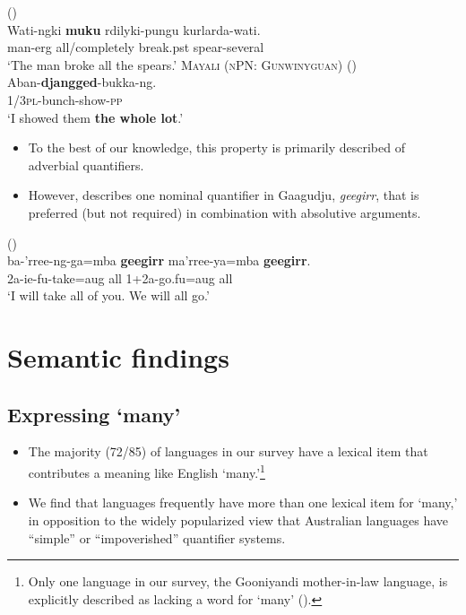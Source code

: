 \documentclass{article}
\makeatletter
\newcommand{\ofy}{/85} %
\makeatother
\begin{document}
\begin{exe}
 (\citealt[15]{bowler17})\\
\gll Wati-ngki \textbf{muku} rdilyki-pungu kurlarda-wati.\\
 man-{\sc erg} all/completely break.{\sc pst} spear-several\\
 \glt `The man broke all the spears.'
\ex \textsc{Mayali (nPN: Gunwinyguan)} (\citealt[233]{evans95})\\
\gll Aban-\textbf{djangged}-bukka-ng.\\
1/3\textsc{pl}-bunch-show-\textsc{pp}\\
\glt `I showed them \textbf{the whole lot}.'
\end{exe}

\begin{itemize}
\item To the best of our knowledge, this property is primarily described of adverbial quantifiers. \item However, \cite{harvey92} describes one nominal quantifier in Gaagudju, {\it geegirr}, that is preferred (but not required) in combination with absolutive arguments.
\end{itemize}

\begin{exe}
 (\citealt[307]{harvey92})\\
\gll ba-'rree-ng-ga=mba \textbf{geegirr} ma'rree-ya=mba \textbf{geegirr}.\\ 
2{\sc a-ie-fu}-take={\sc aug} all 1+2{\sc a}-go.{\sc fu=aug} all\\
\glt `I will take all of you. We will all go.'
\end{exe}


\section{Semantic findings}
\label{sec:semfind}

\subsection{Expressing `many'}

\begin{itemize}
    \item The majority (72\ofy) of languages in our survey have a lexical item that  contributes a meaning like English `many.'\footnote{Only one language in our survey, the Gooniyandi mother-in-law language, is explicitly described as lacking a word for `many' (\citealt[636]{mcgregor89}).}
    \item We find that languages frequently have more than one lexical item for `many,' in opposition to the widely popularized view that Australian languages have ``simple'' or ``impoverished'' quantifier systems.
\end{itemize}
\end{document}
